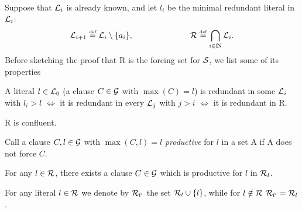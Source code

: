 Suppose that $\mbox {$\cal L$}_i$ is already known, and let \(l_i\) be the minimal redundant
literal in \(\mbox {$\cal L$}_i\):
\begin{equation} \label{eq:atoms-model}
\mbox {$\cal L$}_{i+1} \mathrel {\stackrel {\mbox {\tiny def}}{=}} \mbox {$\cal L$}_i \setminus \{a_i\}, \hspace{7em}
\mbox {$\cal R$} \mathrel {\stackrel {\mbox {\tiny def}}{=}} \bigcap_{i\in {{\rm I\!N}}} \mbox {$\cal L$}_i.
\end{equation}
%
Before sketching the proof that \C R is the forcing set for $\mbox {$\cal S$}$, 
we list some of its properties
%
\begin{lemma} \label{le:redundancy-limit}
A literal \(l\in\mbox {$\cal L$}_0\) (a clause \(C\in \mbox {$\cal G$}\) with \(\max(C)=l\)) is
redundant in some \(\mbox {$\cal L$}_i\) with \(l_i>l\) $\iff$ it is redundant in every
\(\mbox {$\cal L$}_j\) with $j>i$ $\iff$ it is redundant in \C R.
\end{lemma}

\begin{corollary} \label{co:model-confluent}
\C R is confluent.
\end{corollary}

\begin{definition} \label{def:productive}
Call a clause \(C,l\in \mbox {$\cal G$}\) with \(\max(C,l)=l\) {\em productive} for $l$
in a set \C A if \C A does not force $C$.
\end{definition}

\begin{lemma} \label{le:productive-clause}
For any \(l\in\mbox {$\cal R$}\), there exists a clause \(C\in\mbox {$\cal G$}\) which is productive
for $l$ in \(\mbox {$\cal R$}_l\).
\end{lemma}
%
For any literal \(l\in\mbox {$\cal R$}\) we denote by \(\mbox {$\cal R$}_{l'}\) the set \(\mbox {$\cal R$}_l\cup\{l\}\), while for \(l\notin\mbox {$\cal R$}\) \(\mbox {$\cal R$}_{l'}=\mbox {$\cal R$}_l\).

